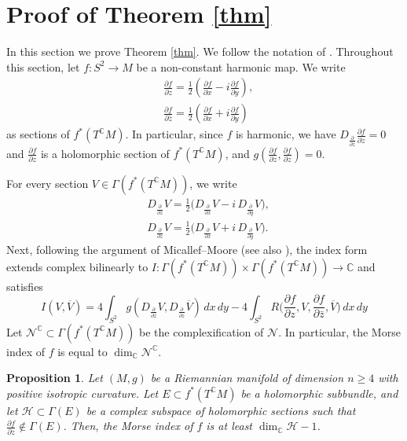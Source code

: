 \documentclass[11pt]{amsart}
\newtheorem{proposition}[theorem]{Proposition}
\theoremstyle{definition}
\begin{document}
\section{Proof of Theorem \ref{thm}}
In this section we prove Theorem \ref{thm}. We follow the notation of \cite[\S1.4]{Brendle2010}. Throughout this section, let $f:S^2\to M$ be a non-constant harmonic map. We write 
\begin{align*}
    &\frac{\partial f}{\partial z}=\frac{1}{2}(\frac{\partial f}{\partial x}-i\frac{\partial f}{\partial y}),\\
    &\frac{\partial f}{\partial\bar z}=\frac{1}{2}(\frac{\partial f}{\partial x}+i\frac{\partial f}{\partial y})
\end{align*}
as sections of $f^*(T^{\mathbb{C}}M)$. In particular, since $f$ is harmonic, we have $D_{\frac{\partial}{\partial \bar z}}\frac{\partial f}{\partial z}=0$ and  $\frac{\partial f}{\partial z}$ is a holomorphic section of $f^*(T^{\mathbb{C}}M)$, and $g(\frac{\partial f}{\partial z},\frac{\partial f}{\partial z})=0$.

For every section $V\in \Gamma(f^*(T^{\mathbb{C}}M))$, we write
\begin{align*}
    &D_{\frac{\partial}{\partial z}}V=\frac{1}{2}\big(D_{\frac{\partial}{\partial x}}V-i\,D_{\frac{\partial}{\partial y}}V\big),\\
    &D_{\frac{\partial}{\partial\bar z}}V=\frac{1}{2}\big(D_{\frac{\partial}{\partial x}}V+i\,D_{\frac{\partial}{\partial y}}V\big).
\end{align*}
Next, following the argument of Micallef--Moore \cite{MM1988} (see also \cite[Proposition 1.16]{Brendle2010}), the index form extends complex bilinearly to $I:\Gamma(f^*(T^{\mathbb C}M))\times \Gamma(f^*(T^{\mathbb C}M))\to \mathbb{C}$ and satisfies
\[
I(V,\overline{V})=4\int_{S^2}g(D_{\frac{\partial}{\partial\bar z}}V,D_{\frac{\partial}{\partial z}}\overline{V})\,dx\,dy-4\int_{S^2}R\Big(\frac{\partial f}{\partial z},V,\frac{\partial f}{\partial\bar z},\overline{V}\Big)\,dx\,dy
\]
Let $\mathscr N^{\mathbb{C}}\subset\Gamma(f^*(T^{\mathbb C}M))$ be the
complexification of $\mathscr N$. In particular, the Morse index of $f$ is equal to $\dim_{\mathbb{C}}\mathscr N^{\mathbb{C}}$.
\begin{proposition}\label{prop}
Let $(M,g)$ be a Riemannian manifold of dimension $n\geq 4$ with positive isotropic curvature. Let $E\subset f^*(T^{\mathbb{C}}M)$ be a holomorphic subbundle, and let $\mathscr H\subset \Gamma(E)$ be a complex subspace of holomorphic sections such that $\frac{\partial f}{\partial z}\notin \Gamma(E)$. Then, the Morse index of $f$ is at least $\dim_{\mathbb C}\mathscr H-1$.
\end{proposition}
\end{document}
